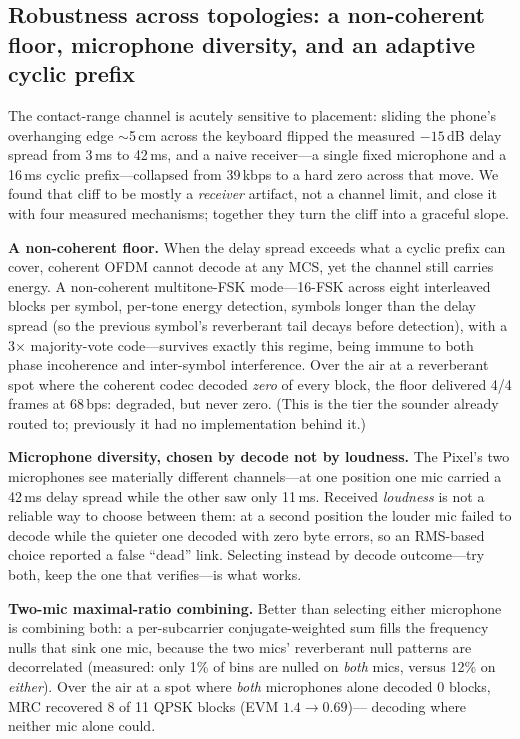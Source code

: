 \documentclass[11pt]{article}
\begin{document}
\subsection{Robustness across topologies: a non-coherent floor, microphone
diversity, and an adaptive cyclic prefix}
\label{sec:robust}

The contact-range channel is acutely sensitive to placement: sliding the phone's
overhanging edge $\sim$5\,cm across the keyboard flipped the measured $-15$\,dB
delay spread from 3\,ms to 42\,ms, and a naive receiver---a single fixed
microphone and a 16\,ms cyclic prefix---collapsed from 39\,kbps to a hard zero
across that move. We found that cliff to be mostly a \emph{receiver} artifact, not
a channel limit, and close it with four measured mechanisms; together they turn
the cliff into a graceful slope.

\textbf{A non-coherent floor.} When the delay spread exceeds what a cyclic prefix
can cover, coherent OFDM cannot decode at any MCS, yet the channel still carries
energy. A non-coherent multitone-FSK mode---16-FSK across eight interleaved blocks
per symbol, per-tone energy detection, symbols longer than the delay spread (so the
previous symbol's reverberant tail decays before detection), with a 3$\times$
majority-vote code---survives exactly this regime, being immune to both phase
incoherence and inter-symbol interference. Over the air at a reverberant spot where
the coherent codec decoded \emph{zero} of every block, the floor delivered 4/4
frames at 68\,bps: degraded, but never zero. (This is the tier the sounder already
routed to; previously it had no implementation behind it.)

\textbf{Microphone diversity, chosen by decode not by loudness.} The Pixel's two
microphones see materially different channels---at one position one mic carried a
42\,ms delay spread while the other saw only 11\,ms. Received \emph{loudness} is
not a reliable way to choose between them: at a second position the louder mic
failed to decode while the quieter one decoded with zero byte errors, so an
RMS-based choice reported a false ``dead'' link. Selecting instead by decode
outcome---try both, keep the one that verifies---is what works.

\textbf{Two-mic maximal-ratio combining.} Better than selecting either microphone
is combining both: a per-subcarrier conjugate-weighted sum fills the frequency
nulls that sink one mic, because the two mics' reverberant null patterns are
decorrelated (measured: only 1\% of bins are nulled on \emph{both} mics, versus
12\% on \emph{either}). Over the air at a spot where \emph{both} microphones alone
decoded 0 blocks, MRC recovered 8 of 11 QPSK blocks (EVM $1.4\rightarrow0.69$)---
decoding where neither mic alone could.
\end{document}
